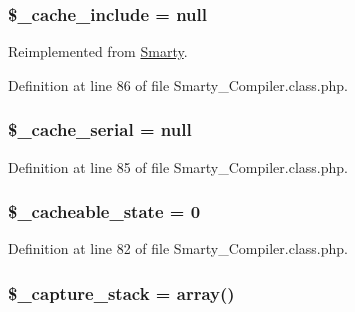 \hypertarget{class_smarty___compiler_a7f51c31864e6e5241313a2102dd32808}{
\subsubsection[{\$\-\_\-cache\-\_\-include}]{\setlength{\rightskip}{0pt plus 5cm}\$\-\_\-cache\-\_\-include = null}}\label{class_smarty___compiler_a7f51c31864e6e5241313a2102dd32808}


\-Reimplemented from \hyperlink{class_smarty_a7f51c31864e6e5241313a2102dd32808}{\-Smarty}.



\-Definition at line 86 of file \-Smarty\-\_\-\-Compiler.\-class.\-php.

\hypertarget{class_smarty___compiler_af01cffcfcbea585daa04a4c97e85029a}{
\subsubsection[{\$\-\_\-cache\-\_\-serial}]{\setlength{\rightskip}{0pt plus 5cm}\$\-\_\-cache\-\_\-serial = null}}\label{class_smarty___compiler_af01cffcfcbea585daa04a4c97e85029a}


\-Definition at line 85 of file \-Smarty\-\_\-\-Compiler.\-class.\-php.

\hypertarget{class_smarty___compiler_a3047c5783d60e62dba5a8d3e6ff272bf}{
\subsubsection[{\$\-\_\-cacheable\-\_\-state}]{\setlength{\rightskip}{0pt plus 5cm}\$\-\_\-cacheable\-\_\-state = 0}}\label{class_smarty___compiler_a3047c5783d60e62dba5a8d3e6ff272bf}


\-Definition at line 82 of file \-Smarty\-\_\-\-Compiler.\-class.\-php.

\hypertarget{class_smarty___compiler_a432edd60bdfac5d87814fb00c2661b20}{
\subsubsection[{\$\-\_\-capture\-\_\-stack}]{\setlength{\rightskip}{0pt plus 5cm}\$\-\_\-capture\-\_\-stack = array()}}\label{class_smarty___compiler_a432edd60bdfac5d87814fb00c2661b20}


